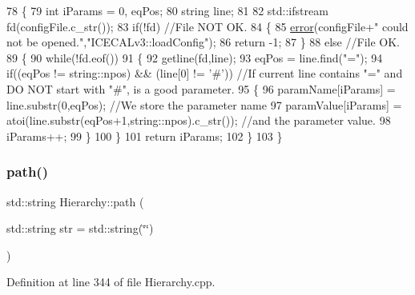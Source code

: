 \begin{DoxyCode}
78 \{
79     \textcolor{keywordtype}{int} iParams = 0, eqPos;
80     \textcolor{keywordtype}{string} line;    
81 
82     std::ifstream fd(configFile.c\_str());
83     \textcolor{keywordflow}{if}(!fd)                                 \textcolor{comment}{//File NOT OK.}
84     \{
85         \hyperlink{classObject_a204a95f57818c0f811933917a30eff45}{error}(configFile+\textcolor{stringliteral}{" could not be opened."},\textcolor{stringliteral}{"ICECALv3::loadConfig"});
86         \textcolor{keywordflow}{return} -1;
87   \}
88     \textcolor{keywordflow}{else}                                        \textcolor{comment}{//File OK.}
89     \{
90         \textcolor{keywordflow}{while}(!fd.eof())                                    
91         \{
92             getline(fd,line);
93             eqPos = line.find(\textcolor{stringliteral}{"="});
94             \textcolor{keywordflow}{if}((eqPos != string::npos) && (line[0] != \textcolor{charliteral}{'#'}))     \textcolor{comment}{//If current line contains "=" and DO NOT
       start with "#", is a good parameter.}
95             \{
96                 paramName[iParams]  = line.substr(0,eqPos);                                                         \textcolor{comment}{
      //We store the parameter name}
97                 paramValue[iParams] = atoi(line.substr(eqPos+1,string::npos).c\_str());  \textcolor{comment}{//and the parameter
       value.}
98                 iParams++;
99             \}
100         \}
101         \textcolor{keywordflow}{return} iParams;
102     \}
103 \}
\end{DoxyCode}
\mbox{\label{classHierarchy_aa7990fa7caf132d83e361ce033c6c65a}} 
\subsubsection{\texorpdfstring{path()}{path()}}
{\footnotesize\ttfamily std\+::string Hierarchy\+::path (\begin{DoxyParamCaption}\item[{std\+::string}]{str = {\ttfamily std\+:\+:string(\char`\"{}\char`\"{})} }\end{DoxyParamCaption})\hspace{0.3cm}{\ttfamily [inherited]}}



Definition at line 344 of file Hierarchy.\+cpp.



